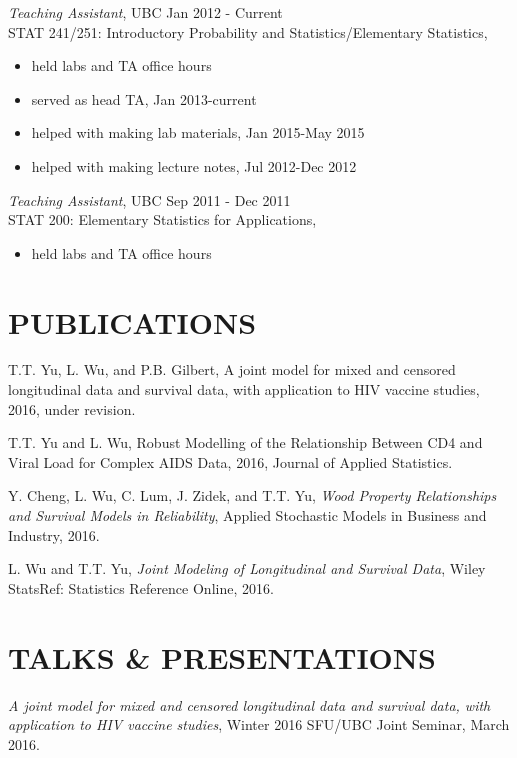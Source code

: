 \documentclass[margin]{res}
\begin{document}
\begin{resume}
{\sl Teaching Assistant}, UBC \hfill Jan 2012 - Current \\
                STAT 241/251: Introductory Probability and Statistics/Elementary Statistics, \\
                 \begin{itemize}  \itemsep -2pt %
                 \item held labs and TA office hours
                 \item served as head TA, Jan 2013-current
                 \item helped with making lab materials, Jan 2015-May 2015
                 \item helped with making lecture notes, Jul 2012-Dec 2012                 
                \end{itemize}
 
 {\sl Teaching Assistant}, UBC \hfill Sep 2011 - Dec 2011 \\
                STAT 200: Elementary Statistics for Applications, 
                \begin{itemize} \itemsep -2pt %
                    \item held labs and TA office hours
                \end{itemize}

\section{PUBLICATIONS} %
T.T. Yu, L. Wu, and P.B. Gilbert, A joint model for mixed and censored longitudinal data and survival data, with application to HIV vaccine studies, 2016, under revision. 

T.T. Yu and L. Wu, Robust Modelling of the Relationship Between CD4 and Viral Load for Complex AIDS Data, 2016, Journal of Applied Statistics.

Y. Cheng, L. Wu, C. Lum, J. Zidek, and T.T. Yu, {\em Wood Property Relationships and Survival Models in Reliability}, Applied Stochastic Models in Business and Industry, 2016.

L. Wu and T.T. Yu, {\em Joint Modeling of Longitudinal and Survival Data}, Wiley StatsRef: Statistics Reference Online, 2016.




\section{TALKS \&  PRESENTATIONS}  
{\it A joint model for mixed and censored longitudinal data and survival data, with application to HIV vaccine studies}, 
Winter 2016 SFU/UBC Joint Seminar, March 2016.


\end{resume}
\end{document}
